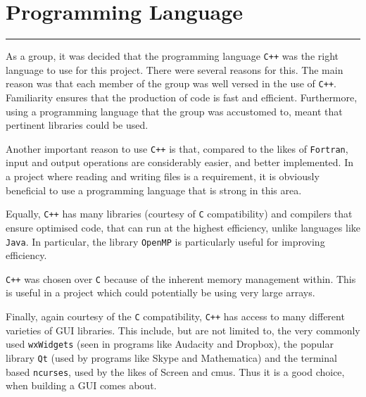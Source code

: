\section{Programming Language}
\vspace{-2em}\rule{\textwidth}{1pt}\vspace{1em}

As a group, it was decided that the programming language \texttt{C++} was the right language to use for this project.
There were several reasons for this.
The main reason was that each member of the group was well versed in the use of \texttt{C++}.
Familiarity ensures that the production of code is fast and efficient.
Furthermore, using a programming language that the group was accustomed to, meant that pertinent libraries could be used.

Another important reason to use \texttt{C++} is that, compared to the likes of \texttt{Fortran}, input and output operations are considerably easier, and better implemented.
In a project where reading and writing files is a requirement, it is obviously beneficial to use a programming language that is strong in this area.

Equally, \texttt{C++} has many libraries (courtesy of \texttt{C} compatibility) and compilers that ensure optimised code, that can run at the highest efficiency, unlike languages like \texttt{Java}.
In particular, the library \texttt{OpenMP} is particularly useful for improving efficiency.

\texttt{C++} was chosen over \texttt{C} because of the inherent memory management within.
This is useful in a project which could potentially be using very large arrays.

Finally, again courtesy of the \texttt{C} compatibility, \texttt{C++} has access to many different varieties of GUI libraries.
This include, but are not limited to, the very commonly used \texttt{wxWidgets} (seen in programs like Audacity and Dropbox), the popular library \texttt{Qt} (used by programs like Skype and Mathematica) and the terminal based \texttt{ncurses}, used by the likes of Screen and cmus.
Thus it is a good choice, when building a GUI comes about.
